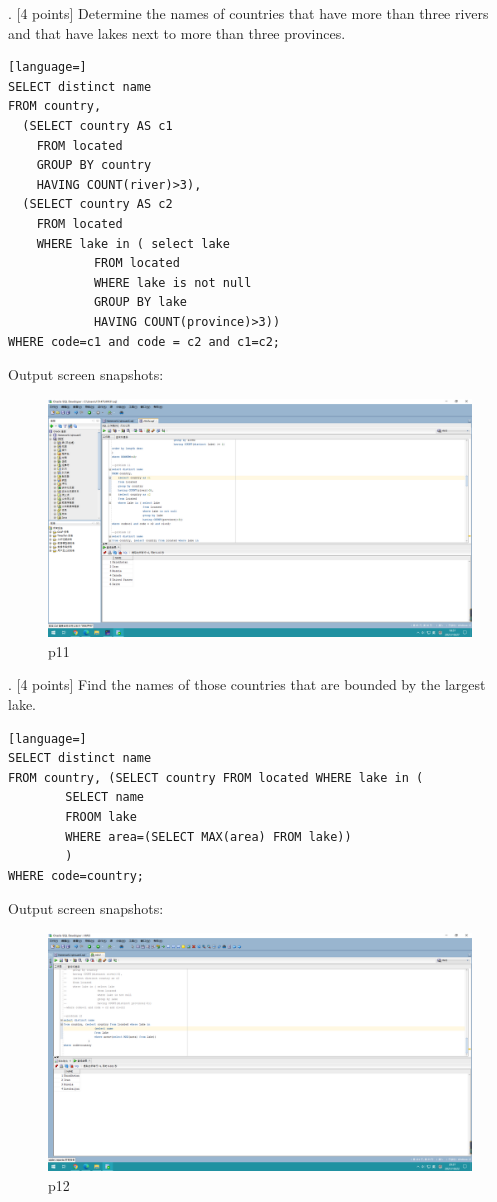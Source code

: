 \documentclass[]{article}
\begin{document}
	. [4 points] Determine the names of countries that have more than three rivers and that have lakes next to more than three provinces.  \\
	
	\begin{lstlisting}[language=] 
SELECT distinct name 
FROM country, 
  (SELECT country AS c1
	FROM located
	GROUP BY country
	HAVING COUNT(river)>3),
  (SELECT country AS c2
	FROM located 
	WHERE lake in ( select lake
			FROM located
			WHERE lake is not null
			GROUP BY lake
			HAVING COUNT(province)>3))
WHERE code=c1 and code = c2 and c1=c2;
	\end{lstlisting} 
	Output screen snapshots:
	\begin{figure}[H]
		\centering
		\includegraphics[width=1\linewidth]{../screen/p11}
		\caption{p11}
		\label{fig:p11}
	\end{figure}
	
	. [4 points] Find the names of those countries that are bounded by the largest lake.		\\
	
	\begin{lstlisting}[language=] 
SELECT distinct name
FROM country, (SELECT country FROM located WHERE lake in (
		SELECT name 
		FROOM lake
		WHERE area=(SELECT MAX(area) FROM lake))
		)
WHERE code=country;
	\end{lstlisting} 
	Output screen snapshots:
	\begin{figure}[H]
		\centering
		\includegraphics[width=0.85\linewidth]{../screen/p12}
		\caption{p12}
		\label{fig:p12}
	\end{figure}
	
\end{document}
